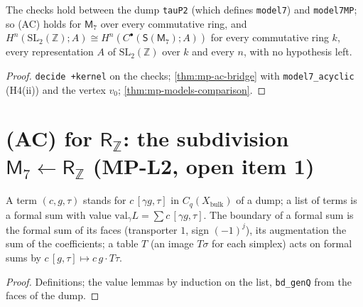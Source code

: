 \begin{theorem}\label{thm:mp-model7-ac}
  \leanok
  The checks hold between the dump \texttt{tauP2} (which defines \texttt{model7}) and \texttt{model7MP}; so (AC) holds for $\mathsf M_7$
  over every commutative ring, and $H^n(\mathrm{SL}_2(\mathbb Z);A)\cong H^n(C^\bullet(\mathsf S(\mathsf M_7);A))$ for every
  commutative ring $k$, every representation $A$ of $\mathrm{SL}_2(\mathbb Z)$ over $k$ and every $n$, with no hypothesis left.
\end{theorem}
\begin{proof}
  \leanok
  \texttt{decide +kernel} on the checks; \ref{thm:mp-ac-bridge} with \texttt{model7\_acyclic} (H4(ii)) and the vertex $v_0$;
  \ref{thm:mp-models-comparison}.
\end{proof}

\section{(AC) for \texorpdfstring{$\mathsf R_{\mathbb Z}$}{R\_Z}: the subdivision \texorpdfstring{$\mathsf M_7\leftarrow\mathsf R_{\mathbb Z}$}{M\_7 <- R\_Z} (MP-L2, open item 1)}

\begin{definition}\label{def:mp-tab}
  \leanok
  A term $(c,g,\tau)$ stands for $c\,[\gamma g,\tau]$ in $C_q(X_{\mathrm{bulk}})$ of a dump; a list of terms is a formal sum with value
  $\mathrm{val}_\gamma L=\sum c\,[\gamma g,\tau]$.  The boundary of a formal sum is the formal sum of its faces (transporter $1$, sign
  $(-1)^j$), its augmentation the sum of the coefficients; a table $T$ (an image $T\sigma$ for each simplex) acts on formal sums by
  $c\,[g,\tau]\mapsto c\,g\cdot T\tau$.
\end{definition}
\begin{proof}
  \leanok
  Definitions; the value lemmas by induction on the list, \texttt{bd\_genQ} from the faces of the dump.
\end{proof}

